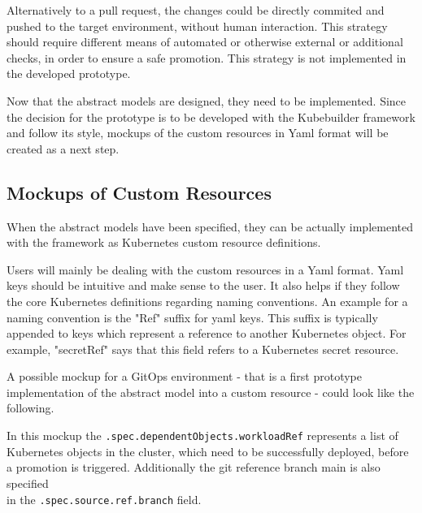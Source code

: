 Alternatively to a pull request, the changes could be directly
commited and pushed to the target environment,
without human interaction. This strategy should require different means
of automated or otherwise external or additional checks, in order to ensure a safe promotion.
This strategy is not implemented in the developed prototype.

Now that the abstract models are designed,
they need to be implemented.
Since the decision for the prototype is to be developed
with the Kubebuilder framework and follow its style,
mockups of the custom resources in Yaml format
will be created as a next step.









\subsection{Mockups of Custom Resources}


When the abstract models have been specified,
they can be actually implemented with the framework
as Kubernetes custom resource definitions.

Users will mainly be dealing with the custom resources in a Yaml format.
Yaml keys should be intuitive and make sense to the user.
It also helps if they follow the core Kubernetes definitions regarding naming conventions.
An example for a naming convention is the "Ref" suffix for yaml keys.
This suffix is typically appended to keys which represent a reference to another Kubernetes
object.
For example, "secretRef" says that this field refers to a Kubernetes secret resource.

A possible mockup for a GitOps environment -
that is a first prototype implementation of the abstract model into a custom resource -
could look like the following.



In this mockup the \lstinline|.spec.dependentObjects.workloadRef|
represents a list of Kubernetes objects in the cluster,
which need to be successfully deployed,
before a promotion is triggered.
Additionally the git reference branch main is also specified \\
in the \lstinline|.spec.source.ref.branch| field.

